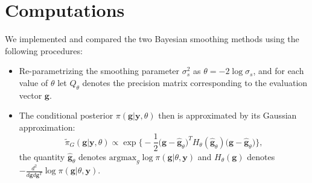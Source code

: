 \documentclass{beamer} %
\begin{document}
\section{Computations}
\begin{frame}
We implemented and compared the two Bayesian smoothing methods using the following procedures:

\begin{itemize}
\pause
\item Re-parametrizing the smoothing parameter $\sigma_s^2$ as $\theta = -2\log \sigma_s$, and for each value of $\theta$ let $Q_\theta$ denotes the precision matrix corresponding to the evaluation vector $\boldsymbol{g}$.
\pause
\item The conditional posterior $\pi(\boldsymbol{g}|\boldsymbol{y},\theta)$ then is approximated by its Gaussian approximation:
\begin{equation}\label{GaussianApproxi}
\tilde{\pi}_G(\boldsymbol{g}|\boldsymbol{y},\theta) \propto \exp \bigg\{ -\frac{1}{2} \bigg(\boldsymbol{g} - \hat{\boldsymbol{g}}_\theta \bigg)^T H_\theta (\hat{\boldsymbol{g}}_\theta) \bigg(\boldsymbol{g} - \hat{\boldsymbol{g}}_\theta \bigg) \bigg\},
\end{equation}
the quantity $\hat{\boldsymbol{g}}_\theta$ denotes $\text{argmax}_g \log \pi (\boldsymbol{g} | \theta, \boldsymbol{y})$ and $H_\theta (\boldsymbol{g})$ denotes $-\frac{d^2}{d\boldsymbol{g}d\boldsymbol{g}^T} \log \pi(\boldsymbol{g} | \theta, \boldsymbol{y})$.
\end{itemize}
\end{frame}
\end{document}
